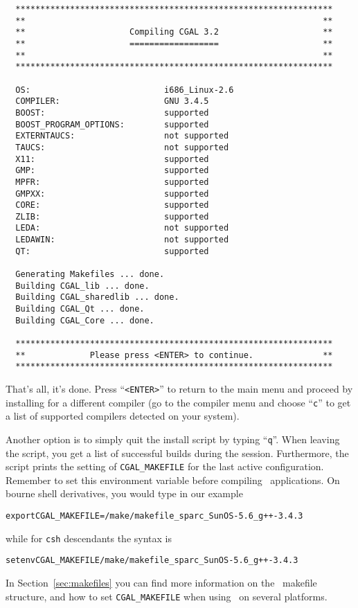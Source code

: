 {\ccTexHtml{\scriptsize}{}
\begin{verbatim}
  ****************************************************************
  **                                                            **
  **                     Compiling CGAL 3.2                     **
  **                     ==================                     **
  **                                                            **
  ****************************************************************

  OS:                           i686_Linux-2.6
  COMPILER:                     GNU 3.4.5
  BOOST:                        supported
  BOOST_PROGRAM_OPTIONS:        supported
  EXTERNTAUCS:                  not supported
  TAUCS:                        not supported
  X11:                          supported
  GMP:                          supported
  MPFR:                         supported
  GMPXX:                        supported
  CORE:                         supported
  ZLIB:                         supported
  LEDA:                         not supported
  LEDAWIN:                      not supported
  QT:                           supported

  Generating Makefiles ... done.
  Building CGAL_lib ... done.
  Building CGAL_sharedlib ... done.
  Building CGAL_Qt ... done.
  Building CGAL_Core ... done.

  ****************************************************************
  **             Please press <ENTER> to continue.              **
  ****************************************************************
\end{verbatim}}
{
}  

That's all, it's done. Press ``\texttt{<ENTER>}'' to return to the
main menu and proceed by installing for a different compiler (go to
the compiler menu and choose ``\texttt{c}'' to get a list of supported
compilers detected on your system). 

Another option is to simply quit the install script by typing
``\texttt{q}''. When leaving the script, you get a list of successful
builds during the session.  Furthermore, the script prints the setting
of \texttt{CGAL\_MAKEFILE} for the last active configuration. Remember
to set this environment variable before compiling \cgal\ applications.
On bourne shell derivatives, you would type in our example
\begin{alltt}
      export CGAL_MAKEFILE=\cgaldir/make/makefile_sparc_SunOS-5.6_g++-3.4.3
\end{alltt}
while for \texttt{csh} descendants the syntax is
\begin{alltt}
      setenv CGAL_MAKEFILE \cgaldir/make/makefile_sparc_SunOS-5.6_g++-3.4.3
\end{alltt}
In Section~\ref{sec:makefiles} you can find more information on the
\cgal\ makefile structure, and how to set \texttt{CGAL\_MAKEFILE} when
using \cgal\ on several platforms.

